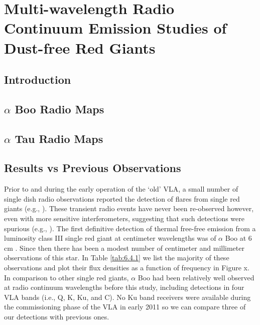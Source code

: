
\chapter{Multi-wavelength Radio Continuum Emission Studies of \\ Dust-free Red Giants} \label{chap:6}

\section{Introduction}\label{sec:6.1}
\section{$\alpha$ Boo Radio Maps}\label{sec:6.2}
\section{$\alpha$ Tau Radio Maps}\label{sec:6.3}
\section{Results vs Previous Observations}\label{sec:6.4}
Prior to and during the early operation of the `old' VLA, a small number of single dish radio observations reported the detection of flares from single red giants (e.g., \citealt{slee_1989}). These transient radio events have never been re-observed however, even with more sensitive interferometers, suggesting that such detections were spurious (e.g., \citealt{beasley_1992}). The first definitive detection of thermal free-free emission from a luminosity class III single red giant at centimeter wavelengths was of $\alpha$ Boo at 6 cm \citep{drake_1983,drake_1986}. Since then there has been a modest number of centimeter and millimeter observations of this star. In Table \ref{tab:6.4.1} we list the majority of these observations and plot their flux densities as a function of frequency in Figure x. In comparison to other single red giants, $\alpha$ Boo had been relatively well observed at radio continuum wavelengths before this study, including detections in four VLA bands (i.e., Q, K, Ku, and C). No Ku band receivers were available during the commissioning phase of the VLA in early 2011 so we can compare three of our detections with previous ones. \\

